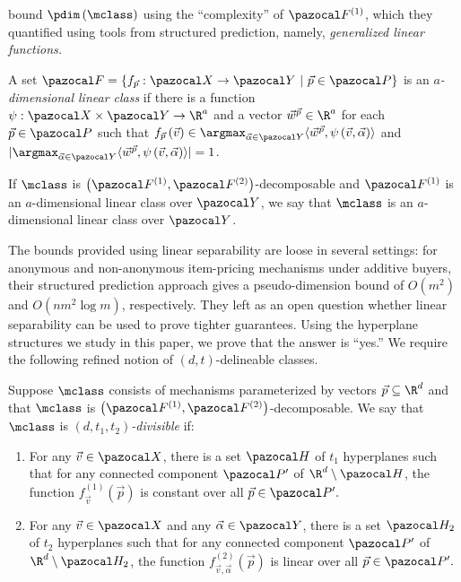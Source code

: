 \citet{Morgenstern16:Learning} bound $\pdim\left(\mclass\right)$ using the ``complexity'' of $\fclass^{\left(1\right)}$, which they quantified using tools from structured prediction, namely, \emph{generalized linear functions.}

\begin{definition}
A set $\fclass = \left\{f_{\vec{p}}: \domain  \to \range \ | \ \vec{p} \in \pspace\right\}$ is an \emph{$a$-dimensional linear class} if
 there is a function $\psi: \domain \times \range \to \R^a$ and a vector $\vec{w}^{\vec{p}} \in \R^a$ for each $\vec{p} \in \pspace$ such that $f_{\vec{p}}\left(\vec{v}\right) \in \argmax_{\vec{\alpha} \in \range} \langle \vec{w}^{\vec{p}}, \psi\left(\vec{v},\vec{\alpha}\right)\rangle$ and $|\argmax_{\vec{\alpha} \in \range} \langle \vec{w}^{\vec{p}}, \psi\left(\vec{v},\vec{\alpha}\right)\rangle| = 1$.
\end{definition}

If $\mclass$ is $\left(\fclass^{(1)}, \fclass^{(2)}\right)$-decomposable and $\fclass^{(1)}$ is an $a$-dimensional linear class over $\range$, we say that $\mclass$ is an $a$-dimensional linear class over $\range$.


The bounds \citet{Morgenstern16:Learning} provided using linear separability are loose in several settings: for anonymous and non-anonymous item-pricing mechanisms under additive buyers, their structured prediction approach gives a pseudo-dimension bound of $O\left(m^2\right)$ and $O\left(nm^2\log m\right)$, respectively. They left as an open question whether linear separability can be used to prove tighter guarantees. Using the hyperplane structures we study in this paper, we prove that the answer is ``yes.'' We require the following refined notion of $\left(d,t\right)$-delineable classes.

\begin{definition}
Suppose $\mclass$ consists of mechanisms parameterized by vectors $\vec{p} \subseteq \R^d$ and that $\mclass$ is $\left(\fclass^{\left(1\right)}, \fclass^{\left(2\right)}\right)$-decomposable. We say that $\mclass$ is \emph{$\left(d,t_1,t_2\right)$-divisible} if:
\begin{enumerate}
\item For any $\vec{v} \in \domain$, there is a set $\hyp$ of $t_1$ hyperplanes such that for any connected component $\pspace'$ of $\R^d \setminus \hyp$, the function $f_{\vec{v}}^{\left(1\right)}\left(\vec{p}\right)$ is constant over all $\vec{p} \in \pspace'.$
\item For any $\vec{v} \in \domain$ and any $\vec{\alpha} \in \range$, there is a set $\hyp_2$ of $t_2$ hyperplanes such that for any connected component $\pspace'$ of $\R^d \setminus \hyp_2$, the function $f_{\vec{v}, \vec{\alpha}}^{\left(2\right)}\left(\vec{p}\right)$ is linear over all $\vec{p} \in \pspace'.$
\end{enumerate}
\end{definition}

